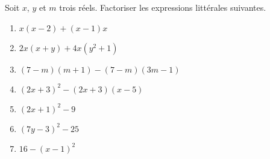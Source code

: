 
Soit $x$, $y$ et $m$ trois réels. Factoriser les expressions littérales suivantes.

\begin{enumerate}
\item $x(x-2)+(x-1)x$
\item $2x(x+y)+4x(y^2+1)$
\item $(7-m)(m+1)-(7-m)(3m-1)$
\item $(2x+3)^2-(2x+3)(x-5)$
\item $(2x+1)^2-9$
\item $(7y-3)^2-25$
\item $16-(x-1)^2$
\end{enumerate}

